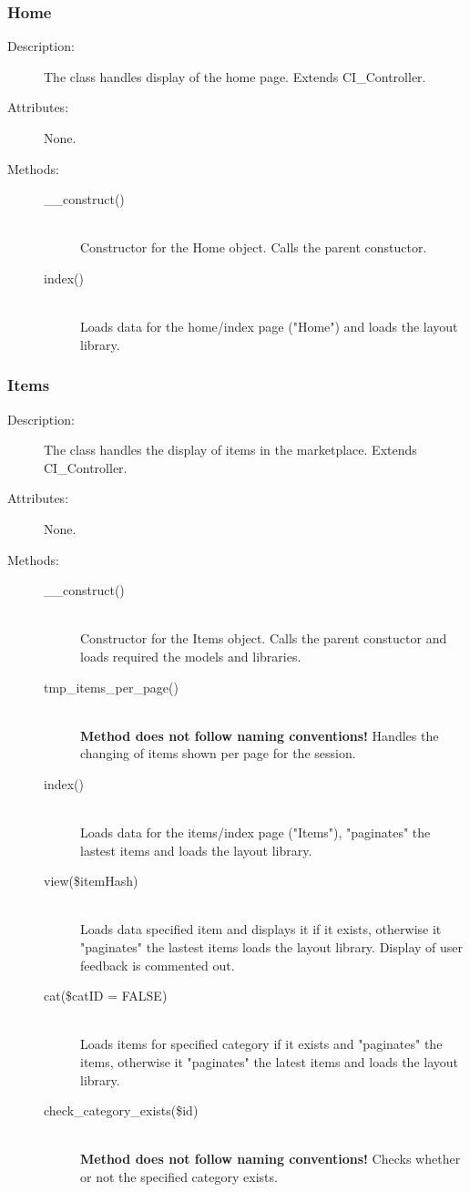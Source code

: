 \documentclass[11pt]{article} %
\begin{document}
\subsubsection{Home}
\begin{description}
\item[Description:] The class handles display of the home page. Extends CI\_Controller.
\item[Attributes:] None.
\item[Methods:] \textbf{ }
\begin{description}
\item[\_\_construct()]  \textbf{ }\\
Constructor for the Home object. Calls the parent constuctor.
\item[index()]  \textbf{ }\\
Loads data for the home/index page ("Home") and loads the layout library.
\end{description} 
\end{description} 


\subsubsection{Items}
\begin{description}
\item[Description:] The class handles the display of items in the marketplace. Extends CI\_Controller.
\item[Attributes:] None.
\item[Methods:] \textbf{ }
\begin{description}
\item[\_\_construct()]  \textbf{ }\\
Constructor for the Items object. Calls the parent constuctor and loads required the models and libraries.
\item[tmp\_items\_per\_page()]  \textbf{ }\\
\textbf{Method does not follow naming conventions!} Handles the changing of items shown per page for the session.
\item[index()]  \textbf{ }\\
Loads data for the items/index page ("Items"), "paginates" the lastest items and loads the layout library.
\item[view(\$itemHash)]  \textbf{ }\\
Loads data specified item and displays it if it exists, otherwise it  "paginates" the lastest items loads the layout library. Display of user feedback is commented out.
\item[cat(\$catID = FALSE)]  \textbf{ }\\
Loads items for specified category if it exists and "paginates" the items, otherwise it "paginates" the latest items and loads the layout library.
\item[check\_category\_exists(\$id)]  \textbf{ }\\
\textbf{Method does not follow naming conventions!} Checks whether or not the specified category exists.
\end{description} 
\end{description} 
\end{document}
